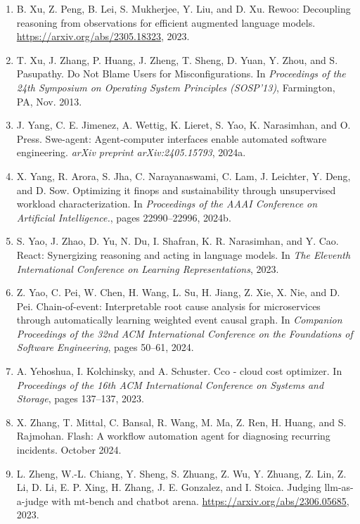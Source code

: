 \documentclass[10pt,UTF8,fontset=fandol]{ctexart}
\begin{document}
\begin{enumerate}[leftmargin=2em,itemsep=2pt]
\item B. Xu, Z. Peng, B. Lei, S. Mukherjee, Y. Liu, and D. Xu. Rewoo: Decoupling reasoning from observations for efficient augmented language models. \url{https://arxiv.org/abs/2305.18323}, 2023.

\item T. Xu, J. Zhang, P. Huang, J. Zheng, T. Sheng, D. Yuan, Y. Zhou, and S. Pasupathy. Do Not Blame Users for Misconfigurations. In \textit{Proceedings of the 24th Symposium on Operating System Principles (SOSP'13)}, Farmington, PA, Nov. 2013.

\item J. Yang, C. E. Jimenez, A. Wettig, K. Lieret, S. Yao, K. Narasimhan, and O. Press. Swe-agent: Agent-computer interfaces enable automated software engineering. \textit{arXiv preprint arXiv:2405.15793}, 2024a.

\item X. Yang, R. Arora, S. Jha, C. Narayanaswami, C. Lam, J. Leichter, Y. Deng, and D. Sow. Optimizing it finops and sustainability through unsupervised workload characterization. In \textit{Proceedings of the AAAI Conference on Artificial Intelligence.}, pages 22990--22996, 2024b.

\item S. Yao, J. Zhao, D. Yu, N. Du, I. Shafran, K. R. Narasimhan, and Y. Cao. React: Synergizing reasoning and acting in language models. In \textit{The Eleventh International Conference on Learning Representations}, 2023.

\item Z. Yao, C. Pei, W. Chen, H. Wang, L. Su, H. Jiang, Z. Xie, X. Nie, and D. Pei. Chain-of-event: Interpretable root cause analysis for microservices through automatically learning weighted event causal graph. In \textit{Companion Proceedings of the 32nd ACM International Conference on the Foundations of Software Engineering}, pages 50--61, 2024.

\item A. Yehoshua, I. Kolchinsky, and A. Schuster. Cco - cloud cost optimizer. In \textit{Proceedings of the 16th ACM International Conference on Systems and Storage}, pages 137--137, 2023.

\item X. Zhang, T. Mittal, C. Bansal, R. Wang, M. Ma, Z. Ren, H. Huang, and S. Rajmohan. Flash: A workflow automation agent for diagnosing recurring incidents. October 2024.

\item L. Zheng, W.-L. Chiang, Y. Sheng, S. Zhuang, Z. Wu, Y. Zhuang, Z. Lin, Z. Li, D. Li, E. P. Xing, H. Zhang, J. E. Gonzalez, and I. Stoica. Judging llm-as-a-judge with mt-bench and chatbot arena. \url{https://arxiv.org/abs/2306.05685}, 2023.


\end{enumerate}
\end{document}
